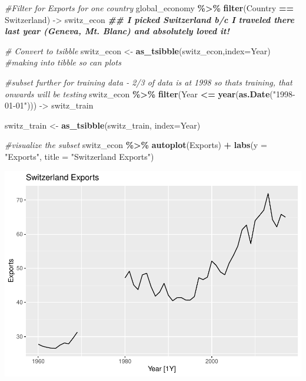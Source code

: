 \documentclass[
]{article}
\newenvironment{Shaded}{\begin{snugshade}}{\end{snugshade}}
\newcommand{\AttributeTok}[1]{\textcolor[rgb]{0.13,0.29,0.53}{#1}}
\newcommand{\CommentTok}[1]{\textcolor[rgb]{0.56,0.35,0.01}{\textit{#1}}}
\newcommand{\DocumentationTok}[1]{\textcolor[rgb]{0.56,0.35,0.01}{\textbf{\textit{#1}}}}
\newcommand{\FunctionTok}[1]{\textcolor[rgb]{0.13,0.29,0.53}{\textbf{#1}}}
\newcommand{\NormalTok}[1]{#1}
\newcommand{\OtherTok}[1]{\textcolor[rgb]{0.56,0.35,0.01}{#1}}
\newcommand{\SpecialCharTok}[1]{\textcolor[rgb]{0.81,0.36,0.00}{\textbf{#1}}}
\newcommand{\StringTok}[1]{\textcolor[rgb]{0.31,0.60,0.02}{#1}}
\begin{document}
\begin{Shaded}
\begin{Highlighting}[]
\CommentTok{\#Filter for Exports for one country}
\NormalTok{global\_economy }\SpecialCharTok{\%\textgreater{}\%} 
    \FunctionTok{filter}\NormalTok{(Country }\SpecialCharTok{==} \StringTok{\textquotesingle{}Switzerland\textquotesingle{}}\NormalTok{) }\OtherTok{{-}\textgreater{}}\NormalTok{ switz\_econ  }
\DocumentationTok{\#\# I picked Switzerland b/c I traveled there last year (Geneva, Mt. Blanc) and absolutely loved it!}

\CommentTok{\# Convert to \textasciigrave{}tsibble\textasciigrave{}}
\NormalTok{switz\_econ }\OtherTok{\textless{}{-}} \FunctionTok{as\_tsibble}\NormalTok{(switz\_econ,}\AttributeTok{index=}\NormalTok{Year) }\CommentTok{\#making into tibble so can plots}

\CommentTok{\#subset further for training data {-} 2/3 of data is at 1998 so thats training, that onwards will be testing}
\NormalTok{switz\_econ }\SpecialCharTok{\%\textgreater{}\%}
    \FunctionTok{filter}\NormalTok{(Year }\SpecialCharTok{\textless{}=} \FunctionTok{year}\NormalTok{(}\FunctionTok{as.Date}\NormalTok{(}\StringTok{"1998{-}01{-}01"}\NormalTok{))) }\OtherTok{{-}\textgreater{}}\NormalTok{ switz\_train}

\NormalTok{switz\_train }\OtherTok{\textless{}{-}} \FunctionTok{as\_tsibble}\NormalTok{(switz\_train, }\AttributeTok{index=}\NormalTok{Year)}

\CommentTok{\#visualize the subset}
\NormalTok{switz\_econ }\SpecialCharTok{\%\textgreater{}\%}
  \FunctionTok{autoplot}\NormalTok{(Exports) }\SpecialCharTok{+}
  \FunctionTok{labs}\NormalTok{(}\AttributeTok{y =} \StringTok{"Exports"}\NormalTok{, }\AttributeTok{title =} \StringTok{"Switzerland Exports"}\NormalTok{)}
\end{Highlighting}
\end{Shaded}

\includegraphics{MontgomeryR_Assignment3_files/figure-latex/unnamed-chunk-2-1.pdf}
\end{document}
